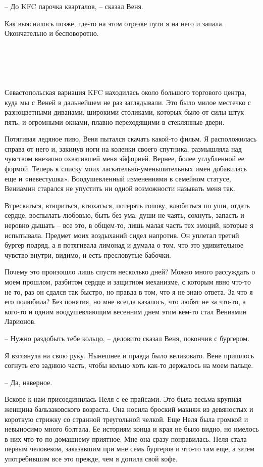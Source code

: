 \documentclass[
]{book}
\begin{document}
-- До KFC парочка кварталов, -- сказал Веня.

Как выяснилось позже, где-то на этом отрезке пути я на него и запала. Окончательно и бесповоротно.

\hypertarget{chapter-14}{%
\chapter{~}\label{chapter-14}}

Севастопольская вариация KFC находилась около большого торгового центра, куда мы с Веней в дальнейшем не раз заглядывали. Это было милое местечко с разноцветными диванами, широкими столиками, которых было от силы штук пять, и огромными окнами, плавно переходящими в стеклянные двери.

Потягивая ледяное пиво, Веня пытался скачать какой-то фильм. Я расположилась справа от него и, закинув ноги на коленки своего спутника, размышляла над чувством внезапно охватившей меня эйфорией. Вернее, более углубленной ее формой. Теперь к списку моих ласкательно-уменьшительных имен добавилась еще и «невестушка». Воодушевленный изменениями в семейном статусе, Вениамин старался не упустить ни одной возможности называть меня так.

Втрескаться, втюриться, втюхаться, потерять голову, влюбиться по уши, отдать сердце, воспылать любовью, быть без ума, души не чаять, сохнуть, запасть и неровно дышать -- все это, в общем-то, лишь малая часть тех эмоций, которые я испытывала. Предмет моих воздыханий сидел напротив. Он уплетал третий бургер подряд, а я потягивала лимонад и думала о том, что это удивительное чувство внутри, видимо, и есть пресловутые бабочки.

Почему это произошло лишь спустя несколько дней? Можно много рассуждать о моем прошлом, разбитом сердце и защитном механизме, с которым явно что-то не то, раз он сдался так быстро, но правда в том, что я не знаю ответа. За что я его полюбила? Без понятия, но мне всегда казалось, что любят не за что-то, а кого-то и одним воодушевляющим весенним днем этим кем-то стал Вениамин Ларионов.

-- Нужно раздобыть тебе кольцо, -- деловито сказал Веня, покончив с бургером.

Я взглянула на свою руку. Нынешнее и правда было великовато. Вене пришлось согнуть его заднюю часть, чтобы кольцо хоть как-то держалось на моем пальце.

-- Да, наверное.

Вскоре к нам присоединилась Неля с ее прайсами. Это была весьма крупная женщина бальзаковского возраста. Она носила броский макияж из девяностых и короткую стрижку со странной треугольной челкой. Еще Неля была громкой и невыносимо много болтала. Ее историям конца и края не было видно, но имелось в них что-то по-домашнему приятное. Мне она сразу понравилась. Неля стала первым человеком, заказавшим при мне семь бургеров и что-то там еще, а затем употребившим все это прежде, чем я допила свой кофе.
\end{document}
